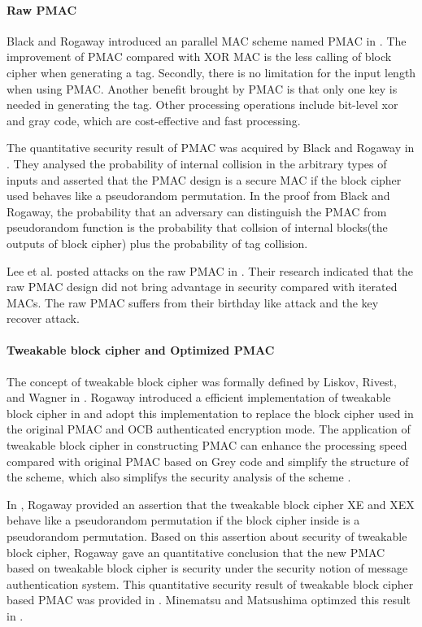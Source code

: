 \documentclass{article}
\begin{document}
\paragraph{Raw PMAC}
Black and Rogaway introduced an parallel MAC scheme named PMAC in \cite{pmac}. 
The improvement of PMAC compared with XOR MAC is the less calling of block cipher when generating a tag. Secondly, there is no limitation for the input length when using PMAC. 
Another benefit brought by PMAC is that only one key is needed in generating the tag. Other processing operations include bit-level xor and gray code, which are cost-effective and fast processing. 

The quantitative security result of PMAC was acquired by Black and Rogaway in \cite{pmac}. They analysed the probability of internal collision in the arbitrary types of inputs and asserted that the PMAC design is a secure MAC if the block cipher used behaves like a pseudorandom permutation. In the proof from Black and Rogaway, the probability that an adversary can distinguish the PMAC from pseudorandom function is the probability that collsion of internal blocks(the outputs of block cipher) plus the probability of tag collision. 

Lee et al. posted attacks on the raw PMAC in \cite{pmac_forgery}. Their research indicated that the raw PMAC design did not bring advantage in security compared with iterated MACs. The raw PMAC suffers from their birthday like attack and the key recover attack.
 
\paragraph{Tweakable block cipher and Optimized PMAC}
The concept of tweakable block cipher was formally defined by Liskov, Rivest, and Wagner in \cite{tweak}. Rogaway introduced a efficient implementation of tweakable block cipher in \cite{tweak_pmac}and adopt this implementation to replace the block cipher used in the original PMAC and OCB authenticated encryption mode.
The application of tweakable block cipher in constructing PMAC can enhance the processing speed compared with original PMAC based on Grey code and simplify the structure of the scheme, which also simplifys the security analysis of the scheme . 

In \cite{tweak_pmac}, Rogaway provided an assertion that the tweakable block cipher XE and XEX behave like a pseudorandom permutation if the block cipher inside is a pseudorandom permutation. Based on this assertion about security of tweakable block cipher, Rogaway gave an quantitative conclusion that the new PMAC based on tweakable block cipher is security under the security notion of message authentication system. This quantitative security result of tweakable block cipher based PMAC was provided in \cite{tweak_pmac}.
Minematsu and Matsushima optimzed this result in \cite{new}. 
\end{document}
